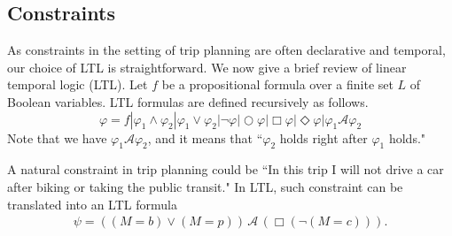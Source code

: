 \documentclass[letterpaper]{article}
\newcommand{\cA}{\mathcal{A}}
\begin{document}
\subsection{Constraints}
As constraints in the setting of trip planning are often declarative and
temporal, our choice of LTL is straightforward.
We now give a brief review of linear temporal logic (LTL).
Let $f$ be a propositional formula over a finite set $L$ of Boolean variables.  
LTL formulas are defined recursively as follows.
\begin{equation}
	\varphi = f | \varphi_1 \land \varphi_2 | \varphi_1 \lor \varphi_2 | \neg \varphi | 
		\bigcirc \varphi |	\Box \varphi | \Diamond \varphi | \varphi_1 \cA \varphi_2
\end{equation}
Note that we have $\varphi_1 \cA \varphi_2$, and it means that
``$\varphi_2$ holds right after $\varphi_1$ holds."

A natural constraint in trip planning could be ``In this trip I will not drive a car 
after biking or taking the public transit."
In LTL, such constraint can be translated into an LTL formula
\begin{align*}
	\psi = ((M=b) \lor (M=p)) \,\cA\, (\Box (\neg (M=c))).
\end{align*}
\end{document}
